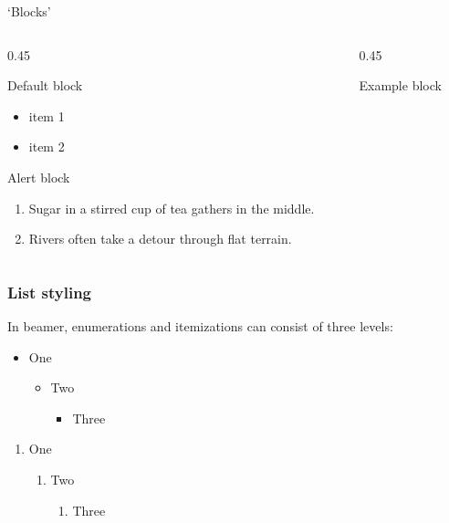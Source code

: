 \begin{frame}{`Blocks'}
  \begin{columns}[onlytextwidth]
    \begin{column}{0.45\textwidth}
      \begin{block}{Default block}
        \begin{itemize}
          \item item 1
          \item item 2
        \end{itemize}
      \end{block}
      \begin{alertblock}{Alert block}
        \begin{enumerate}
          \item Sugar in a stirred cup of tea gathers in the middle.
          \item Rivers often take a detour through flat terrain.
        \end{enumerate}
      \end{alertblock}
    \end{column}
    \begin{column}{0.45\textwidth}
      \begin{exampleblock}{Example block}
        \center
        
      \end{exampleblock}
    \end{column}
  \end{columns}
\end{frame}


\begin{frame}
  \minipage[t]{\linewidth}
  \frametitle{List styling}
  In beamer, enumerations and itemizations can consist of three levels:
  \begin{itemize}
    \item One
    \begin{itemize}
    \item Two
    \begin{itemize}
      \item Three
    \end{itemize}
    \end{itemize}
  \end{itemize}
  \begin{enumerate}
    \item One
    \begin{enumerate}
    \item Two
    \begin{enumerate}
      \item Three
    \end{enumerate}
    \end{enumerate}
  \end{enumerate}
  \endminipage
\end{frame}


